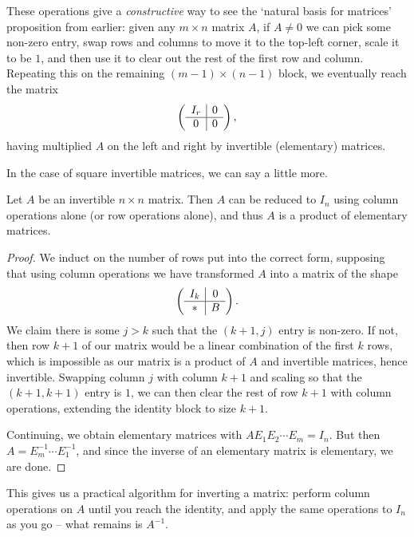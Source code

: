 These operations give a \emph{constructive} way to see the `natural basis for matrices' proposition from earlier: given any $m \times n$ matrix $A$, if $A \neq 0$ we can pick some non-zero entry, swap rows and columns to move it to the top-left corner, scale it to be $1$, and then use it to clear out the rest of the first row and column. Repeating this on the remaining $(m - 1) \times (n - 1)$ block, we eventually reach the matrix
$$
\left(\begin{array}{ c | c }
    I_r & 0 \\
    \hline
    0 & 0
  \end{array}\right),
$$
having multiplied $A$ on the left and right by invertible (elementary) matrices.

In the case of square invertible matrices, we can say a little more.

\begin{proposition}
    Let $A$ be an invertible $n \times n$ matrix. Then $A$ can be reduced to $I_n$ using column operations alone (or row operations alone), and thus $A$ is a product of elementary matrices.
\end{proposition}
\begin{proof}
    We induct on the number of rows put into the correct form, supposing that using column operations we have transformed $A$ into a matrix of the shape
    $$
    \left(\begin{array}{ c | c }
        I_k & 0 \\
        \hline
        * & B
      \end{array}\right).
    $$
    We claim there is some $j > k$ such that the $(k + 1, j)$ entry is non-zero. If not, then row $k+1$ of our matrix would be a linear combination of the first $k$ rows, which is impossible as our matrix is a product of $A$ and invertible matrices, hence invertible.
    Swapping column $j$ with column $k + 1$ and scaling so that the $(k+1, k+1)$ entry is $1$, we can then clear the rest of row $k + 1$ with column operations, extending the identity block to size $k + 1$.

    Continuing, we obtain elementary matrices with $A E_1 E_2 \cdots E_m = I_n$. But then $A = E_m^{-1} \cdots E_1^{-1}$, and since the inverse of an elementary matrix is elementary, we are done.
\end{proof}

This gives us a practical algorithm for inverting a matrix: perform column operations on $A$ until you reach the identity, and apply the same operations to $I_n$ as you go -- what remains is $A^{-1}$.


